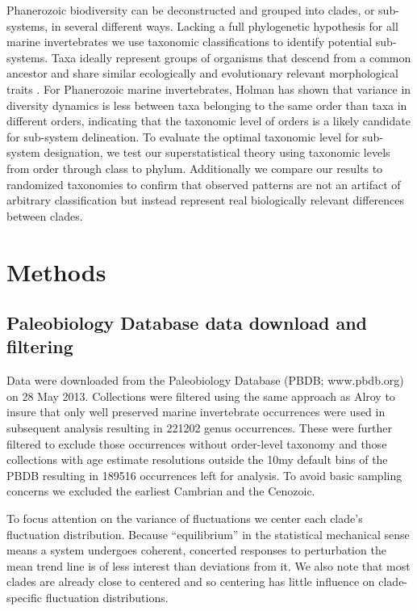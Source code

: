 Phanerozoic biodiversity can be deconstructed and grouped into clades,
or sub-systems, in several different ways. Lacking a full phylogenetic
hypothesis for all marine invertebrates we use taxonomic
classifications to identify potential sub-systems.  Taxa ideally
represent groups of organisms that descend from a common ancestor and
share similar ecologically and evolutionary relevant morphological
traits \citep{mayr1965systZool, erwin2007}.  For Phanerozoic marine
invertebrates, Holman \citep{holman1989} has shown that variance in
diversity dynamics is less between taxa belonging to the same order
than taxa in different orders, indicating that the taxonomic level of
orders is a likely candidate for sub-system delineation. To evaluate
the optimal taxonomic level for sub-system designation, we test our
superstatistical theory using taxonomic levels from order through
class to phylum. Additionally we compare our results to randomized
taxonomies to confirm that observed patterns are not an artifact of
arbitrary classification but instead represent real biologically
relevant differences between clades.

\section{Methods}

\subsection{Paleobiology Database data download and filtering}
Data were downloaded from the Paleobiology Database (PBDB;
www.pbdb.org) on 28 May 2013. Collections were filtered using the same
approach as Alroy \citep{alroy08} to insure that only well preserved
marine invertebrate occurrences were used in subsequent analysis
resulting in 221202 genus occurrences. These were further filtered to
exclude those occurrences without order-level taxonomy and those
collections with age estimate resolutions outside the 10my default
bins of the PBDB resulting in 189516 occurrences left for analysis. To
avoid basic sampling concerns we excluded the earliest Cambrian and
the Cenozoic.

To focus attention on the variance of fluctuations we center each
clade's fluctuation distribution. Because ``equilibrium'' in the
statistical mechanical sense means a system undergoes coherent,
concerted responses to perturbation the mean trend line is of less
interest than deviations from it. We also note that most clades are
already close to centered and so centering has little influence on
clade-specific fluctuation distributions.

